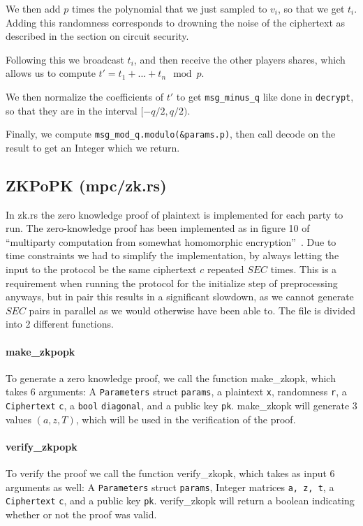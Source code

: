 \documentclass[../main.tex]{subfiles}
\begin{document}
We then add $p$ times the polynomial that we just sampled to $v_i$, so that we get $t_i$. Adding this randomness corresponds to drowning the noise of the ciphertext as described in the section on circuit security.

Following this we broadcast $t_i$, and then receive the other players shares, which allows us to compute $t' = t_1 + ... + t_n \mod p$.

We then normalize the coefficients of $t'$ to get \lstinline{msg_minus_q} like done in \lstinline{decrypt}, so that they are in the interval $[-q/2, q/2)$.

Finally, we compute \lstinline{msg_mod_q.modulo(&params.p)}, then call decode on the result to get an Integer which we return.

\subsection{ZKPoPK (mpc/zk.rs)}
In zk.rs the zero knowledge proof of plaintext is implemented for each party to run.
The zero-knowledge proof has been implemented as in figure 10 of ``multiparty computation from somewhat homomorphic encryption''~\cite{damgaard2012multiparty}.
Due to time constraints we had to simplify the implementation, by always letting the input to the protocol be the same ciphertext $c$ repeated $SEC$ times.
This is a requirement when running the protocol for the initialize step of preprocessing anyways, but in pair this results in a significant slowdown, as we cannot generate $SEC$ pairs in parallel as we would otherwise have been able to.
The file is divided into 2 different functions.
\paragraph{make\_zkpopk}
To generate a zero knowledge proof, we call the function make\_zkopk, which takes 6 arguments:
A \lstinline{Parameters} struct \lstinline{params}, a plaintext \lstinline{x}, randomness \lstinline{r}, a \lstinline{Ciphertext} \lstinline{c}, a \lstinline{bool} \lstinline{diagonal}, and a public key \lstinline{pk}.
make\_zkopk will generate 3 values $(a, z, T)$, which will be used in the verification of the proof.

\paragraph{verify\_zkpopk}
To verify the proof we call the function verify\_zkopk, which takes as input 6 arguments as well:
A \lstinline{Parameters} struct \lstinline{params}, Integer matrices \lstinline{a, z, t}, a \lstinline{Ciphertext} \lstinline{c}, and a public key \lstinline{pk}.
verify\_zkopk will return a boolean indicating whether or not the proof was valid.
\end{document}
